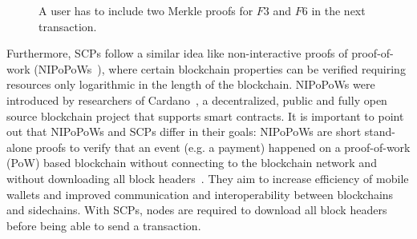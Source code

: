 \documentclass[conference]{IEEEtran}
\begin{document}
\begin{figure}[hbt]
\centering
{}   
\caption{A user has to include two Merkle proofs for $F3$ and $F6$ in the next transaction.\label{fig:SCPExample}}
\end{figure}

Furthermore, SCPs follow a similar idea like non-interactive proofs of proof-of-work (NIPoPoWs~\cite{Kiayias17}), where certain blockchain properties can be verified requiring resources only logarithmic in the length of the blockchain. NIPoPoWs were introduced by researchers of Cardano~\cite{Cardano}, a decentralized, public and fully open source blockchain project that supports smart contracts. It is important to point out that NIPoPoWs and SCPs differ in their goals: NIPoPoWs are short stand-alone proofs to verify that an event (e.g. a payment) happened on a proof-of-work (PoW) based blockchain without connecting to the blockchain network and without downloading all block headers~\cite{NIPoPoWs}. They aim to increase efficiency of mobile wallets and improved communication and interoperability between blockchains and sidechains. With SCPs, nodes are required to download all block headers before being able to send a transaction.
\end{document}
